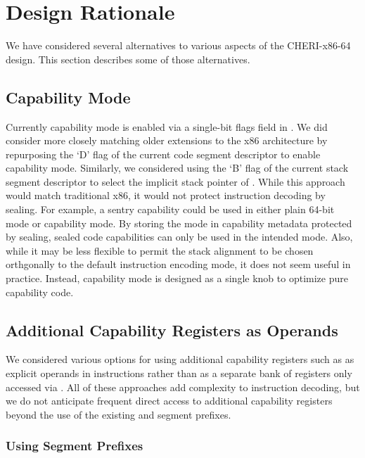 \section{Design Rationale}

We have considered several alternatives to various aspects of the
CHERI-x86-64 design.  This section describes some of those
alternatives.

\subsection{Capability Mode}

Currently capability mode is enabled via a single-bit flags field in
\CIP{}.  We did consider more closely matching older extensions to the
x86 architecture by repurposing the `D' flag of the current code
segment descriptor to enable capability mode.  Similarly, we
considered using the `B' flag of the current stack segment descriptor
to select the implicit stack pointer of \CSP{}.  While this approach
would match traditional x86, it would not protect instruction decoding
by sealing.  For example, a sentry capability could be used in either
plain 64-bit mode or capability mode.  By storing the mode in
capability metadata protected by sealing, sealed code capabilities can
only be used in the intended mode.  Also, while it may be less
flexible to permit the stack alignment to be chosen orthgonally to the
default instruction encoding mode, it does not seem useful in
practice.  Instead, capability mode is designed as a single knob to
optimize pure capability code.

\subsection{Additional Capability Registers as Operands}

We considered various options for using additional capability
registers such as \CGS{} as explicit operands in instructions rather
than as a separate bank of registers only accessed via
.  All of these approaches add complexity to
instruction decoding, but we do not anticipate frequent direct access
to additional capability registers beyond the use of the existing
\FS{} and \GS{} segment prefixes.

\subsubsection{Using Segment Prefixes}

